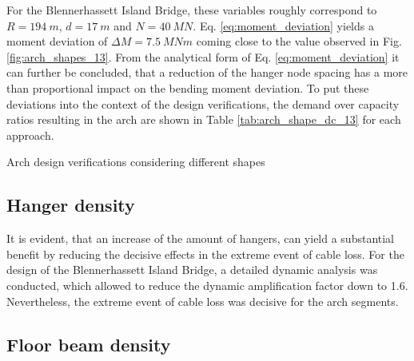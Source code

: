 For the Blennerhassett Island Bridge, these variables roughly correspond to $R=\SI{194}{m}$, $d=\SI{17}{m}$ and $N=\SI{40}{MN}$. Eq. \eqref{eq:moment_deviation} yields a moment deviation of $\Delta M=\SI{7.5}{MNm}$ coming close to the value observed in Fig. \ref{fig:arch_shapes_13}. From the analytical form of Eq. \eqref{eq:moment_deviation} it can further be concluded, that a reduction of the hanger node spacing has a more than proportional impact on the bending moment deviation. To put these deviations into the context of the design verifications, the demand over capacity ratios resulting in the arch are shown in Table \ref{tab:arch_shape_dc_13} for each approach.

\begin{table}[H]
    \centering
    
    \caption{Arch design verifications considering different shapes}
    \label{tab:arch_shape_dc_13}
\end{table}














\subsection{Hanger density}
It is evident, that an increase of the amount of hangers, can yield a substantial benefit by reducing the decisive effects in the extreme event of cable loss. For the design of the Blennerhassett Island Bridge, a detailed dynamic analysis was conducted, which allowed to reduce the dynamic amplification factor down to 1.6. Nevertheless, the extreme event of cable loss was decisive for the arch segments.

\subsection{Floor beam density}
